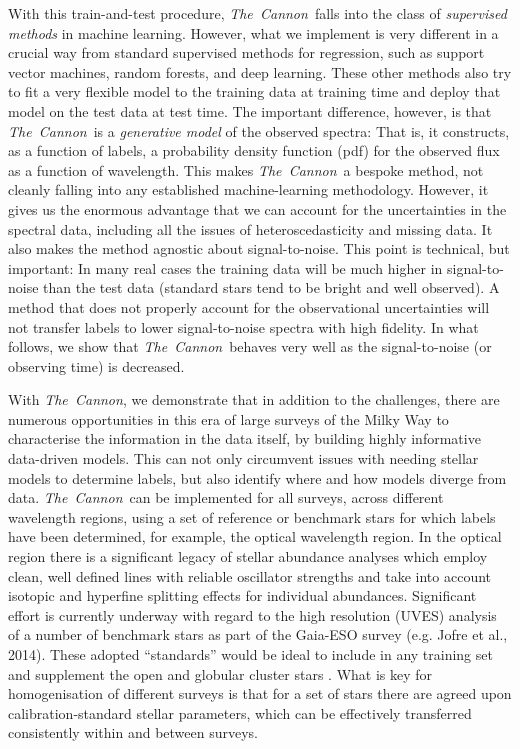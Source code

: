 \documentclass[12pt, preprint]{aastex}
\newcommand{\tc}{\textsl{The~Cannon}}
\begin{document}
With this train-and-test procedure, \tc\ falls into the class of \emph{supervised methods} in machine learning.
However, what we implement is very different in a crucial way from standard supervised methods for regression,
such as support vector machines, random forests, and deep learning.
These other methods also try to fit a very flexible model to the training data at training time
and deploy that model on the test data at test time.
The important difference, however, is that \tc\ is a \emph{generative model} of the observed spectra:
That is, it constructs, as a function of labels,
a probability density function (pdf) for the observed flux as a function of wavelength.
This makes \tc\ a bespoke method, not cleanly falling into any established machine-learning methodology.
However, it gives us the enormous advantage that we can account for the uncertainties in the spectral data,
including all the issues of heteroscedasticity and missing data.
It also makes the method agnostic about signal-to-noise.
This point is technical, but important:
In many real cases the training data will be much higher in signal-to-noise than the test data
(standard stars tend to be bright and well observed).
A method that does not properly account for the observational uncertainties will not transfer labels to lower signal-to-noise
spectra with high fidelity.
In what follows, we show that \tc\ behaves very well as the signal-to-noise (or observing time) is decreased.

With \tc, we demonstrate that in addition to the challenges, there are numerous opportunities in this era of large surveys of the Milky Way to characterise the information in the data itself, by building highly informative data-driven models.  This can not only circumvent issues with needing stellar models to determine labels, but also identify where and how models diverge from data. \tc\ can be implemented for all surveys, across different wavelength regions, using a set of reference or benchmark stars for which labels have been determined, for example, the optical wavelength region. In the optical region there is a significant legacy of stellar abundance analyses which employ clean, well defined lines with reliable oscillator strengths and take into account isotopic and hyperfine splitting effects for individual abundances. Significant effort is currently underway with regard to the high resolution (UVES) analysis of a number of benchmark stars as part of the Gaia-ESO survey (e.g. Jofre et al., 2014). These adopted ``standards'' would be ideal to include in any training set and supplement the open and globular cluster stars . What is key for homogenisation of different surveys is that for a set of stars there are agreed upon calibration-standard stellar parameters, which can be effectively transferred consistently within and between surveys.  
\end{document}
